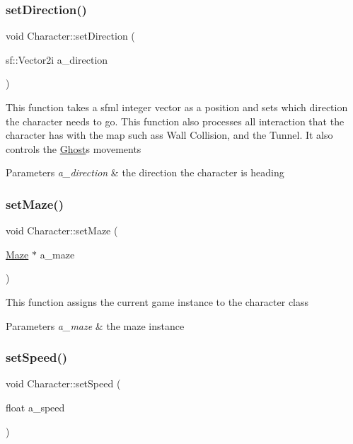 \subsubsection{\texorpdfstring{set\+Direction()}{setDirection()}}
{\footnotesize\ttfamily void Character\+::set\+Direction (\begin{DoxyParamCaption}\item[{sf\+::\+Vector2i}]{a\+\_\+direction }\end{DoxyParamCaption})}

This function takes a sfml integer vector as a position and sets which direction the character needs to go. This function also processes all interaction that the character has with the map such ass Wall Collision, and the Tunnel. It also controls the \hyperlink{class_ghost}{Ghost}\textquotesingle{}s movements


\begin{DoxyParams}{Parameters}
{\em a\+\_\+direction} & the direction the character is heading \\
\hline
\end{DoxyParams}
\mbox{\label{class_character_a4a925db15b8f68d2c8d3201ce41f5863}} 
\subsubsection{\texorpdfstring{set\+Maze()}{setMaze()}}
{\footnotesize\ttfamily void Character\+::set\+Maze (\begin{DoxyParamCaption}\item[{\hyperlink{class_maze}{Maze} $\ast$}]{a\+\_\+maze }\end{DoxyParamCaption})}

This function assigns the current game instance to the character class


\begin{DoxyParams}{Parameters}
{\em a\+\_\+maze} & the maze instance \\
\hline
\end{DoxyParams}
\mbox{\label{class_character_a37068c523c733698c7f7ad587ccc66a0}} 
\subsubsection{\texorpdfstring{set\+Speed()}{setSpeed()}}
{\footnotesize\ttfamily void Character\+::set\+Speed (\begin{DoxyParamCaption}\item[{float}]{a\+\_\+speed }\end{DoxyParamCaption})}


